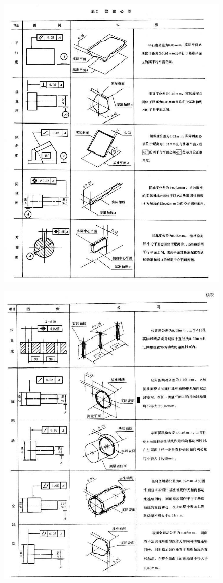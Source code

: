 \begin{figure}[h]
	\centering
	\includegraphics[width=0.9\linewidth]{data/image/13-2}
	\caption{}
\end{figure}

\begin{figure}[h]
	\centering
	\includegraphics[width=0.9\linewidth]{data/image/13-3}
	\caption{}
\end{figure}

